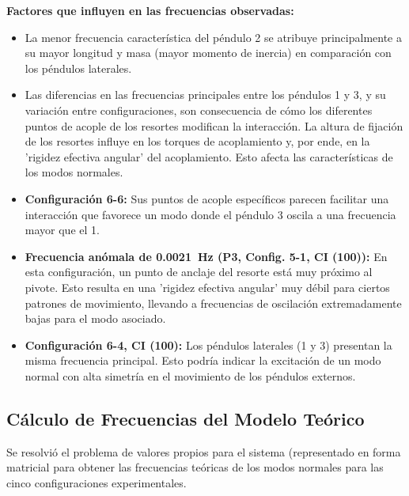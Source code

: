 \textbf{Factores que influyen en las frecuencias observadas:}
\begin{itemize}
  \item La menor frecuencia caracter\'istica del p\'endulo 2 se atribuye
    principalmente a su mayor longitud y masa (mayor momento de inercia)
    en comparaci\'on con los p\'endulos laterales.
  \item Las diferencias en las frecuencias principales entre los p\'endulos 1 y
    3, y su variaci\'on entre configuraciones, son consecuencia de c\'omo
    los diferentes puntos de acople de los resortes modifican la
    interacci\'on. La altura de fijaci\'on de los resortes influye en los
    torques de acoplamiento y, por ende, en la 'rigidez efectiva
    angular' del acoplamiento. Esto afecta las caracter\'isticas de los
    modos normales.
  \item \textbf{Configuraci\'on 6-6:} Sus puntos de acople espec\'ificos
    parecen facilitar una interacci\'on que favorece un modo donde el
    p\'endulo 3 oscila a una frecuencia mayor que el 1.
  \item \textbf{Frecuencia an\'omala de \qty{0.0021}{\Hz} (P3, Config. 5-1,
    CI (100)):} En esta configuraci\'on, un punto de anclaje del
    resorte est\'a muy pr\'oximo al pivote. Esto resulta en una 'rigidez
    efectiva angular' muy d\'ebil para ciertos patrones de movimiento,
    llevando a frecuencias de oscilaci\'on extremadamente bajas para el
    modo asociado.
  \item \textbf{Configuraci\'on 6-4, CI (100):} Los p\'endulos laterales (1 y 3)
    presentan la misma frecuencia principal. Esto podr\'ia indicar la
    excitaci\'on de un modo normal con alta simetr\'ia en el movimiento
    de los p\'endulos externos.
\end{itemize}

\subsection*{C\'alculo de Frecuencias del Modelo Te\'orico}

Se resolvi\'o el problema de valores propios para el sistema (representado
en forma matricial para obtener las frecuencias te\'oricas de los modos normales
para las cinco configuraciones experimentales.

